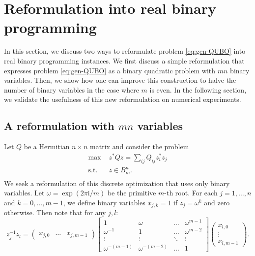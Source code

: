 \documentclass{article}
\theoremstyle{definition}
\renewcommand{\i}{\mathrm{i}}
\begin{document}
\section{Reformulation into real binary programming}\label{sec:reformulations}

In this section, we discuss two ways to reformulate problem \eqref{eq:gen-QUBO} into real binary programming instances. We first discuss a simple reformulation that expresses problem \eqref{eq:gen-QUBO} as a binary quadratic problem with $mn$ binary variables. Then, we show how one can improve this construction to halve the number of binary variables in the case where $m$ is even. In the following section, we validate the usefulness of this new reformulation on  numerical experiments.

\subsection{A reformulation with \texorpdfstring{$mn$}{mn} variables}

Let $Q$ be a Hermitian $n\times n$ matrix and consider the problem
\begin{equation} \label{eq:gen-QUBO-3}
    \begin{aligned}
        \text{max } & z^* Qz = \sum_{ij} Q_{ij} z_i^* z_j\\
        \text{s.t. }&  z\in B_m^n.\\
    \end{aligned}
\end{equation}
We seek a reformulation of this discrete optimization that uses only binary variables. Let $\omega=\exp(2\pi\i/m)$ be the primitive $m$-th root. For each $j=1,\ldots,n$ and $k=0,\ldots,m-1$, we define binary variables $x_{j,k}=1$ if $z_j=\omega^k$ and zero otherwise. Then note that for any $j,l$:
\[
z^{-1}_jz_l=\begin{pmatrix}
    x_{j,0} & \ldots &x_{j,m-1}
\end{pmatrix}\begin{bmatrix}
    1 & \omega & \ldots &\omega^{m-1}\\
    \omega^{-1} & 1 & \ldots & \omega^{m-2}\\
    \vdots & \vdots & \ddots & \vdots\\
    \omega^{-(m-1)} & \omega^{-(m-2)} & \ldots & 1
\end{bmatrix}\begin{pmatrix}
    x_{l,0} \\ \vdots \\ x_{l,m-1}
\end{pmatrix}.
\]
\end{document}
